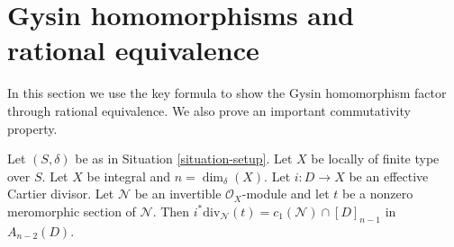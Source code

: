 \section{Gysin homomorphisms and rational equivalence}
\label{section-gysin}

\noindent
In this section we use the key formula to show the Gysin homomorphism
factor through rational equivalence. We also prove an important
commutativity property.

\begin{lemma}
\label{lemma-gysin-factors-general}
Let $(S, \delta)$ be as in Situation \ref{situation-setup}.
Let $X$ be locally of finite type over $S$.
Let $X$ be integral and $n = \dim_\delta(X)$.
Let $i : D \to X$ be an effective Cartier divisor.
Let $\mathcal{N}$ be an invertible $\mathcal{O}_X$-module
and let $t$ be a nonzero meromorphic section of $\mathcal{N}$.
Then $i^*\text{div}_\mathcal{N}(t) = c_1(\mathcal{N}) \cap [D]_{n - 1}$
in $A_{n - 2}(D)$.
\end{lemma}

